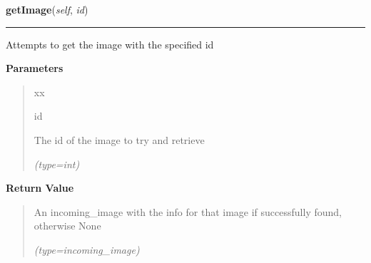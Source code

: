 \hspace{.8\funcindent}\begin{boxedminipage}{\funcwidth}

    \raggedright \textbf{getImage}(\textit{self}, \textit{id})

    \vspace{-1.5ex}

    \rule{\textwidth}{0.5\fboxrule}
\setlength{\parskip}{2ex}
    Attempts to get the image with the specified id

\setlength{\parskip}{1ex}
      \textbf{Parameters}
      \vspace{-1ex}

      \begin{quote}
        \begin{Ventry}{xx}

          \item[id]

          The id of the image to try and retrieve

            {\it (type=int)}

        \end{Ventry}

      \end{quote}

      \textbf{Return Value}
    \vspace{-1ex}

      \begin{quote}
      An incoming\_image with the info for that image if successfully 
      found, otherwise None

      {\it (type=incoming\_image)}

      \end{quote}

    \end{boxedminipage}

    \label{src:dao:incoming_image_dao:IncomingImageDAO:getNextImage}

    \vspace{0.5ex}

